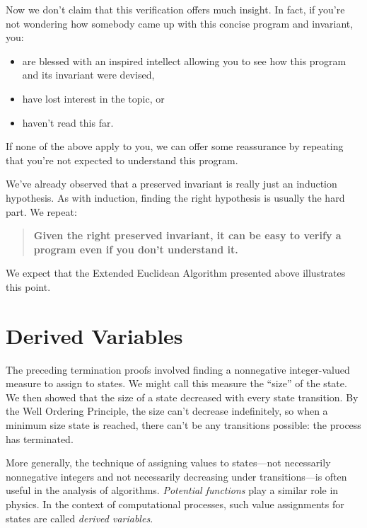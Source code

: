 \begin{editingnotes}
Now we don't claim that this verification offers much insight.  In fact,
if you're not wondering how somebody came up with this concise program and
invariant, you:
\begin{itemize}

\item are blessed with an inspired intellect allowing you to see how this
  program and its invariant were devised,

\item have lost interest in the topic, or

\item haven't read this far.

\end{itemize}
If none of the above apply to you, we can offer some reassurance by
repeating that you're not expected to understand this program.
\end{editingnotes}

We've already observed that a preserved invariant is really just an
induction hypothesis.  As with induction, finding the right hypothesis
is usually the hard part.  We repeat:
\begin{quote}
  \textbf{Given the right preserved invariant, it can be easy to verify a
    program even if you don't understand it.}
\end{quote}
We expect that the Extended Euclidean Algorithm presented above
illustrates this point.

\section{Derived Variables}\label{derived_var_subsec}

The preceding termination proofs involved finding a nonnegative
integer-valued measure to assign to states.  We might call this measure
the ``size'' of the state.  We then showed that the size of a state
decreased with every state transition.  By the Well Ordering Principle,
the size can't decrease indefinitely, so when a minimum size state is
reached, there can't be any transitions possible: the process has
terminated.

More generally, the technique of assigning values to states---not
necessarily nonnegative integers and not necessarily decreasing under
transitions---is often useful in the analysis of algorithms.
\emph{Potential functions} play a similar role in physics.  In the
context of computational processes, such value assignments for states
are called \emph{derived variables}.

